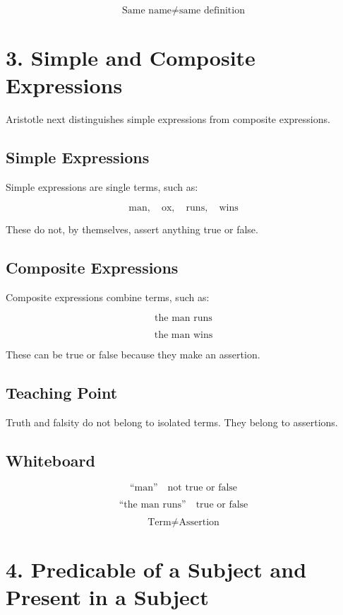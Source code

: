 \documentclass[12pt]{article}
\begin{document}
\[
\boxed{
\text{Same name} \neq \text{same definition}
}
\]

\section*{3. Simple and Composite Expressions}

Aristotle next distinguishes simple expressions from composite expressions.

\subsection*{Simple Expressions}

Simple expressions are single terms, such as:

\[
\text{man}, \quad \text{ox}, \quad \text{runs}, \quad \text{wins}
\]

These do not, by themselves, assert anything true or false.

\subsection*{Composite Expressions}

Composite expressions combine terms, such as:

\[
\text{the man runs}
\]

\[
\text{the man wins}
\]

These can be true or false because they make an assertion.

\subsection*{Teaching Point}

Truth and falsity do not belong to isolated terms. They belong to assertions.

\subsection*{Whiteboard}

\[
\text{``man''} \quad \text{not true or false}
\]

\[
\text{``the man runs''} \quad \text{true or false}
\]

\[
\boxed{
\text{Term} \neq \text{Assertion}
}
\]

\section*{4. Predicable of a Subject and Present in a Subject}
\end{document}
